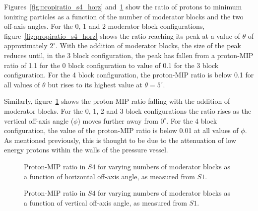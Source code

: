 Figures~\ref{fig:propiratio_s4_horz} and~\ref{fig:propiratio_s4_vert} show the ratio of protons to minimum ionizing particles as a function of the number of moderator blocks and the two off-axis angles.
For the 0, 1 and 2 moderator block configurations, figure~\ref{fig:propiratio_s4_horz} shows the ratio reaching its peak at a value of $\theta$ of approximately $2^{\circ}$.
With the addition of moderator blocks, the size of the peak reduces until, in the 3 block configuration, the peak has fallen from a proton-MIP ratio of 1.1 for the 0 block configuration to value of 0.1 for the 3 block configuration. 
For the 4 block configuration, the proton-MIP ratio is below 0.1 for all values of $\theta$ but rises to its highest value at $\theta = 5^{\circ}$.

Similarly, figure~\ref{fig:propiratio_s4_vert} shows the proton-MIP ratio falling with the addition of moderator blocks.
For the 0, 1, 2 and 3 block configurations the ratio rises as the vertical off-axis angle ($\phi$) moves further away from $0^{\circ}$. 
For the 4 block configuration, the value of the proton-MIP ratio is below 0.01 at all values of $\phi$.
As mentioned previously, this is thought to be due to the attenuation of low energy protons within the walls of the pressure vessel.

\begin{figure}[!ht]
  \begin{minipage}[t]{0.48\textwidth}
    \begin{adjustbox}{max totalsize={\textwidth}{.35\textheight}, center}
      
    \end{adjustbox}
    \caption{Proton-MIP ratio in $\mathit{S4}$ for varying numbers of moderator blocks as a function of horizontal off-axis angle, as measured from $\mathit{S1}$.}
    \label{fig:propiratio_s4_horz}
  \end{minipage}
  \hspace{0.3cm}
  \begin{minipage}[t]{0.48\textwidth}
    \begin{adjustbox}{max totalsize={\textwidth}{.35\textheight}, center}
      
    \end{adjustbox}
    \caption{Proton-MIP ratio in $\mathit{S4}$ for varying numbers of moderator blocks as a function of vertical off-axis angle, as measured from $\mathit{S1}$.}
    \label{fig:propiratio_s4_vert}
  \end{minipage}	
\end{figure}




